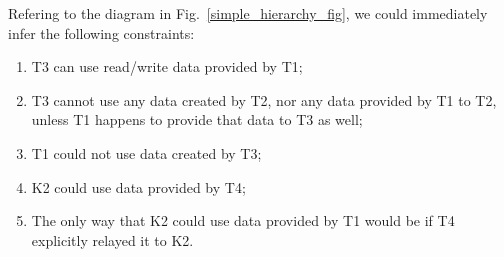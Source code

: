 Refering to the diagram in Fig.~\ref{simple_hierarchy_fig}, we could immediately infer the following constraints:
\begin{enumerate}
\item T3 can use read/write data provided by T1;
\item T3 cannot use any data created by T2, nor any data provided by T1 to T2, unless T1 happens to provide that data to T3 as well;
\item T1 could not use data created by T3;
\item K2 could use data provided by T4;
\item The only way that K2 could use data provided by T1 would be if T4 explicitly relayed it to K2.
\end{enumerate}

